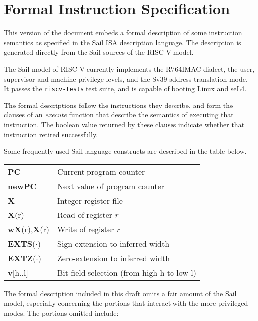 \section{Formal Instruction Specification}

This version of the document embeds a formal description of some
instruction semantics as specified in the Sail ISA description
language\cite{sail-site}.  The description is generated directly from
the Sail sources of the RISC-V model.

The Sail model of RISC-V currently implements the RV64IMAC dialect,
the user, supervisor and machine privilege levels, and the Sv39
address translation mode.  It passes the \texttt{riscv-tests} test
suite, and is capable of booting Linux and seL4.

The formal descriptions follow the instructions they describe, and
form the clauses of an \textit{execute} function that describe the
semantics of executing that instruction.  The boolean value returned
by these clauses indicate whether that instruction retired
successfully.

Some frequently used Sail language constructs are described in the
table below.

\begin{table}[h]
  \begin{center}
    \begin{tabular}{|l|l|} \cline{1-2}
      \textbf{PC}            & Current program counter \\ \cline{1-2}
      \textbf{newPC}         & Next value of program counter \\ \cline{1-2}
      \textbf{X}             & Integer register file \\ \cline{1-2}
      \textbf{X}(r)          & Read of register $r$  \\ \cline{1-2}
      \textbf{wX}(r),\textbf{X}(r) & Write of register $r$ \\ \cline{1-2}
      \textbf{EXTS}($\cdot$) & Sign-extension to inferred width \\ \cline{1-2}
      \textbf{EXTZ}($\cdot$) & Zero-extension to inferred width \\ \cline{1-2}
      \textbf{v}[h..l]       & Bit-field selection (from high h to low l) \\ \cline{1-2}
    \end{tabular}
  \end{center}
\end{table}

The formal description included in this draft omits a fair amount of
the Sail model, especially concerning the portions that interact with
the more privileged modes.  The portions omitted include:

